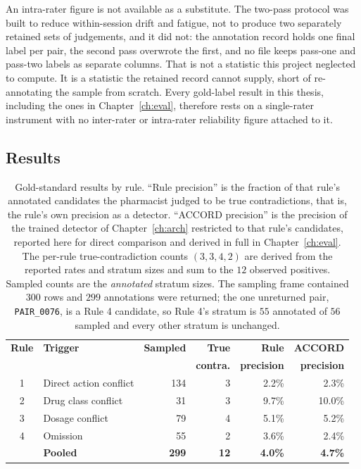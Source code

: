 An intra-rater figure is not available as a substitute. The two-pass protocol
was built to reduce within-session drift and fatigue, not to produce two
separately retained sets of judgements, and it did not: the annotation record
holds one final label per pair, the second pass overwrote the first, and no
file keeps pass-one and pass-two labels as separate columns. That is not a
statistic this project neglected to compute. It is a statistic the retained
record cannot supply, short of re-annotating the sample from scratch. Every
gold-label result in this thesis, including the ones in
Chapter~\ref{ch:eval}, therefore rests on a single-rater instrument with no
inter-rater or intra-rater reliability figure attached to it.

\subsection{Results}

\begin{table}[t]
\centering
\small
\begin{tabular}{clrrrr}
\toprule
\textbf{Rule} & \textbf{Trigger} & \textbf{Sampled} & \textbf{True} & \textbf{Rule} & \textbf{ACCORD} \\
              &                  &                  & \textbf{contra.} & \textbf{precision} & \textbf{precision} \\
\midrule
1 & Direct action conflict & 134 & 3 & 2.2\% & 2.3\% \\
2 & Drug class conflict    & 31  & 3 & 9.7\% & 10.0\% \\
3 & Dosage conflict        & 79  & 4 & 5.1\% & 5.2\% \\
4 & Omission               & 55  & 2 & 3.6\% & 2.4\% \\
\midrule
  & \textbf{Pooled}        & \textbf{299} & \textbf{12} & \textbf{4.0\%} & \textbf{4.7\%} \\
\bottomrule
\end{tabular}
\caption{Gold-standard results by rule. ``Rule precision'' is the fraction of
that rule's annotated candidates the pharmacist judged to be true
contradictions, that is, the rule's own precision as a detector. ``ACCORD
precision'' is the precision of the trained detector of Chapter~\ref{ch:arch}
restricted to that rule's candidates, reported here for direct comparison and
derived in full in Chapter~\ref{ch:eval}. The per-rule true-contradiction counts
$(3,3,4,2)$ are derived from the reported rates and stratum sizes and sum to the
$12$ observed positives. Sampled counts are the \emph{annotated} stratum sizes.
The sampling frame contained $300$ rows and $299$ annotations were returned; the
one unreturned pair, \texttt{PAIR\_0076}, is a Rule 4 candidate, so Rule 4's
stratum is $55$ annotated of $56$ sampled and every other stratum is unchanged.}
\label{tab:gold}
\end{table}

